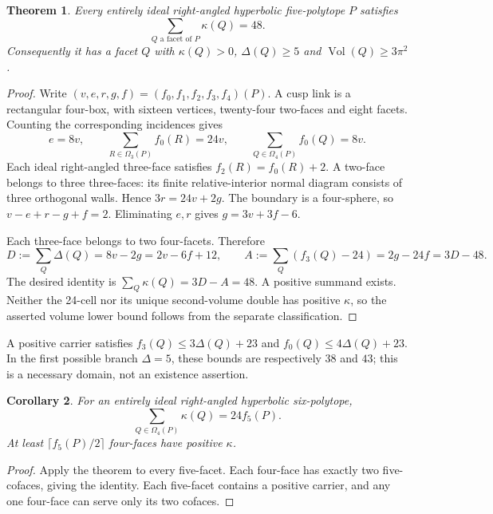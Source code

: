 \documentclass[11pt]{article}
\newtheorem{theorem}{Theorem}
\newtheorem{corollary}[theorem]{Corollary}
\begin{document}
\begin{theorem}
Every entirely ideal right-angled hyperbolic five-polytope $P$ satisfies
\[
 \sum_{Q\text{ a facet of }P}\kappa(Q)=48.
\]
Consequently it has a facet $Q$ with $\kappa(Q)>0$, $\Delta(Q)\ge5$ and
$\operatorname{Vol}(Q)\ge3\pi^2$.
\end{theorem}
\begin{proof}
Write $(v,e,r,g,f)=(f_0,f_1,f_2,f_3,f_4)(P)$. A cusp link is a rectangular
four-box, with sixteen vertices, twenty-four two-faces and eight facets.
Counting the corresponding incidences gives
\[
 e=8v,\qquad \sum_{R\in\Omega_3(P)} f_0(R)=24v,
 \qquad \sum_{Q\in\Omega_4(P)}f_0(Q)=8v.
\]
Each ideal right-angled three-face satisfies $f_2(R)=f_0(R)+2$. A two-face
belongs to three three-faces: its finite relative-interior normal diagram
consists of three orthogonal walls. Hence $3r=24v+2g$. The boundary is a
four-sphere, so $v-e+r-g+f=2$. Eliminating $e,r$ gives
$g=3v+3f-6$.

Each three-face belongs to two four-facets. Therefore
\[
 D:=\sum_Q\Delta(Q)=8v-2g=2v-6f+12,
 \qquad
 A:=\sum_Q(f_3(Q)-24)=2g-24f=3D-48.
\]
The desired identity is $\sum_Q\kappa(Q)=3D-A=48$.
A positive summand exists. Neither the 24-cell nor its unique second-volume
double has positive $\kappa$, so the asserted volume lower bound follows
from the separate classification.
\end{proof}
A positive carrier satisfies $f_3(Q)\le3\Delta(Q)+23$ and
$f_0(Q)\le4\Delta(Q)+23$. In the first possible branch $\Delta=5$, these
bounds are respectively $38$ and $43$; this is a necessary domain, not an
existence assertion.

\begin{corollary}
For an entirely ideal right-angled hyperbolic six-polytope,
\[
 \sum_{Q\in\Omega_4(P)}\kappa(Q)=24f_5(P).
\]
At least $\lceil f_5(P)/2\rceil$ four-faces have positive $\kappa$.
\end{corollary}
\begin{proof}
Apply the theorem to every five-facet. Each four-face has exactly two
five-cofaces, giving the identity. Each five-facet contains a positive
carrier, and any one four-face can serve only its two cofaces.
\end{proof}
\end{document}

